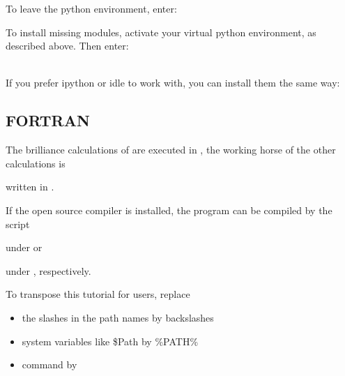 To leave the python environment, enter:


To install missing modules, activate your virtual python environment,
as described above. Then enter:

\\

If you prefer ipython or idle to work with, you can install them the
same way:



\subsection{FORTRAN}

The brilliance calculations of \pB are executed in \Pye,
the working horse of the other calculations is


written in \Fe.

If the open source  compiler  is installed,
the program can be compiled by the script


under \Lin or


under \Wine, respectively.

To transpose this tutorial for \Win users, replace

\begin{itemize}
\item
the slashes in the path names by backslashes
\item
system variables like \$Path by \%PATH\%
\item
command  by 
\end{itemize}
